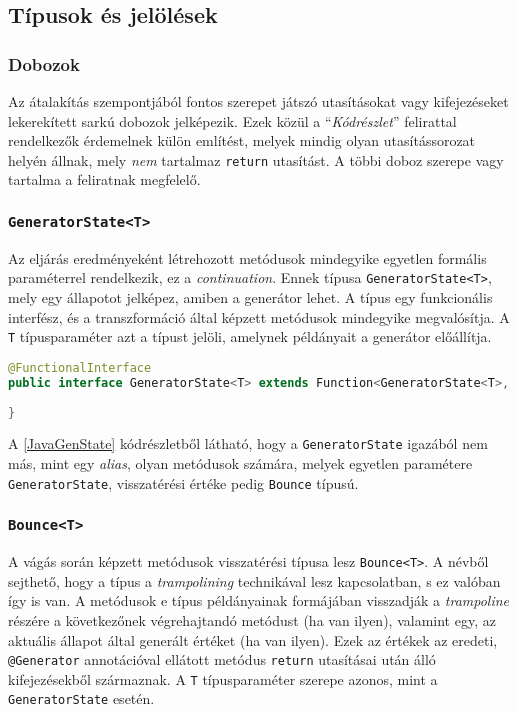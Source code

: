 \subsection{Típusok és jelölések}

\subsubsection{Dobozok}

Az átalakítás szempontjából fontos szerepet játszó utasításokat vagy kifejezéseket lekerekített sarkú dobozok jelképezik. Ezek közül a ``\textit{Kódrészlet}'' felirattal rendelkezők érdemelnek külön említést, melyek mindig olyan utasítássorozat helyén állnak, mely \textit{nem} tartalmaz \texttt{return} utasítást. A többi doboz szerepe vagy tartalma a feliratnak megfelelő.

\subsubsection{\texttt{GeneratorState<T>}}

Az eljárás eredményeként létrehozott metódusok mindegyike egyetlen formális paraméterrel rendelkezik, ez a \textit{continuation}. Ennek típusa \texttt{GeneratorState<T>}, mely egy állapotot jelképez, amiben a generátor lehet. A típus egy funkcionális interfész, és a transzformáció által képzett metódusok mindegyike megvalósítja. A \texttt{T} típusparaméter azt a típust jelöli, amelynek példányait a generátor előállítja.

\begin{lstlisting}[language=Java, caption={A \texttt{GeneratorState<T>} interfész}, captionpos=b, label=JavaGenState, escapechar=$]
@FunctionalInterface
public interface GeneratorState<T> extends Function<GeneratorState<T>, Bounce<T>> {
    
}
\end{lstlisting}

A \ref{JavaGenState} kódrészletből látható, hogy a \texttt{GeneratorState} igazából nem más, mint egy \textit{alias}, olyan metódusok számára, melyek egyetlen paramétere \texttt{GeneratorState}, visszatérési értéke pedig \texttt{Bounce} típusú.

\subsubsection{\texttt{Bounce<T>}}

A vágás során képzett metódusok visszatérési típusa lesz \texttt{Bounce<T>}. A névből sejthető, hogy a típus a \textit{trampolining} technikával lesz kapcsolatban, s ez valóban így is van. A metódusok e típus példányainak formájában visszadják a \textit{trampoline} részére a következőnek végrehajtandó metódust (ha van ilyen), valamint egy, az aktuális állapot által generált értéket (ha van ilyen). Ezek az értékek az eredeti, \texttt{@Generator} annotációval ellátott metódus \texttt{return} utasításai után álló kifejezésekből származnak. A \texttt{T} típusparaméter szerepe azonos, mint a \texttt{GeneratorState} esetén.

